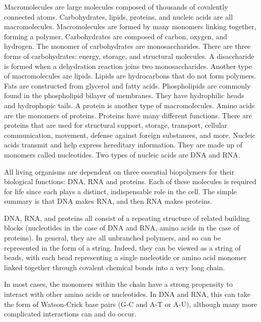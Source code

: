 Macromolecules are large molecules composed of thousands of covalently connected atoms. Carbohydrates, lipids, proteins, and nucleic acids are all macromolecules. Macromolecules are formed by many monomers linking together, forming a polymer. Carbohydrates are composed of carbon, oxygen, and hydrogen. The monomer of carbohydrates are monosaccharides. There are three forms of carbohydrates: energy, storage, and structural molecules. A disaccharide is formed when a dehydration reaction joins two monosaccharides. Another type of macromolecules are lipids. Lipids are hydrocarbons that do not form polymers. Fats are constructed from glycerol and fatty acids. Phospholipids are commonly found in the phospholipid bilayer of membranes. They have hydrophilic heads and hydrophopic tails. A protein is another type of macromolecules. Amino acids are the monomers of proteins. Proteins have many different functions. There are proteins that are used for structural support, storage, transport, cellular communication, movement, defense against foreign substances, and more. Nucleic acids transmit and help express hereditary information. They are made up of monomers called nucleotides. Two types of nucleic acids are DNA and RNA.

All living organisms are dependent on three essential biopolymers for their biological functions: DNA, RNA and proteins. Each of these molecules is required for life since each plays a distinct, indispensable role in the cell. The simple summary is that DNA makes RNA, and then RNA makes proteins.

DNA, RNA, and proteins all consist of a repeating structure of related building blocks (nucleotides in the case of DNA and RNA, amino acids in the case of proteins). In general, they are all unbranched polymers, and so can be represented in the form of a string. Indeed, they can be viewed as a string of beads, with each bead representing a single nucleotide or amino acid monomer linked together through covalent chemical bonds into a very long chain.

In most cases, the monomers within the chain have a strong propensity to interact with other amino acids or nucleotides. In DNA and RNA, this can take the form of Watson-Crick base pairs (G-C and A-T or A-U), although many more complicated interactions can and do occur.

